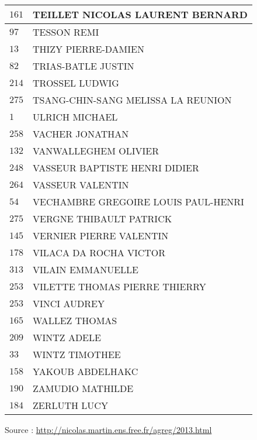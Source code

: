 \begin{xltabular}{\linewidth}{|l|X|}
    \hline
    $161$ & TEILLET NICOLAS LAURENT BERNARD \\
    \hline
    $97$ & TESSON REMI \\
    \hline
    $13$ & THIZY PIERRE-DAMIEN \\
    \hline
    $82$ & TRIAS-BATLE JUSTIN \\
    \hline
    $214$ & TROSSEL LUDWIG \\
    \hline
    $275$ & TSANG-CHIN-SANG MELISSA LA REUNION \\
    \hline
    $1$ & ULRICH MICHAEL \\
    \hline
    $258$ & VACHER JONATHAN \\
    \hline
    $132$ & VANWALLEGHEM OLIVIER \\
    \hline
    $248$ & VASSEUR BAPTISTE HENRI DIDIER \\
    \hline
    $264$ & VASSEUR VALENTIN \\
    \hline
    $54$ & VECHAMBRE GREGOIRE LOUIS PAUL-HENRI \\
    \hline
    $275$ & VERGNE THIBAULT PATRICK \\
    \hline
    $145$ & VERNIER PIERRE VALENTIN \\
    \hline
    $178$ & VILACA DA ROCHA VICTOR \\
    \hline
    $313$ & VILAIN EMMANUELLE \\
    \hline
    $253$ & VILETTE THOMAS PIERRE THIERRY \\
    \hline
    $253$ & VINCI AUDREY \\
    \hline
    $165$ & WALLEZ THOMAS \\
    \hline
    $209$ & WINTZ ADELE \\
    \hline
    $33$ & WINTZ TIMOTHEE \\
    \hline
    $158$ & YAKOUB ABDELHAKC \\
    \hline
    $190$ & ZAMUDIO MATHILDE \\
    \hline
    $184$ & ZERLUTH LUCY \\
    \hline
  \end{xltabular}

  \begin{flushright}
    {\tiny Source : \url{http://nicolas.martin.ens.free.fr/agreg/2013.html}}
  \end{flushright}


